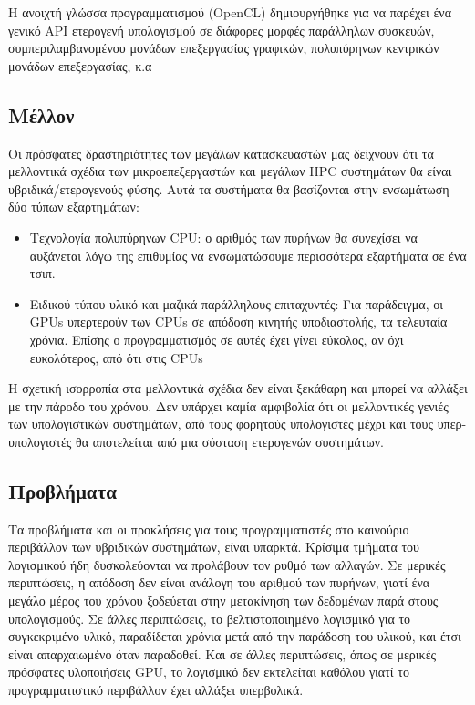 Η ανοιχτή γλώσσα προγραμματισμού (OpenCL) δημιουργήθηκε για να παρέχει ένα γενικό API ετερογενή υπολογισμού σε διάφορες μορφές παράλληλων συσκευών, συμπεριλαμβανομένου μονάδων επεξεργασίας γραφικών, πολυπύρηνων κεντρικών μονάδων επεξεργασίας, κ.α
\subsection{Μέλλον}
Οι πρόσφατες δραστηριότητες των μεγάλων κατασκευαστών μας δείχνουν ότι τα μελλοντικά σχέδια των μικροεπεξεργαστών και μεγάλων HPC συστημάτων θα είναι υβριδικά/ετερογενούς φύσης. Αυτά τα συστήματα θα βασίζονται στην ενσωμάτωση δύο τύπων εξαρτημάτων:
\begin{itemize}
\item Τεχνολογία πολυπύρηνων CPU: ο αριθμός των πυρήνων θα συνεχίσει να αυξάνεται λόγω της επιθυμίας να ενσωματώσουμε περισσότερα εξαρτήματα σε ένα τσιπ.
\item Ειδικού τύπου υλικό και μαζικά παράλληλους επιταχυντές: Για παράδειγμα, οι GPUs υπερτερούν των CPUs σε απόδοση κινητής υποδιαστολής, τα τελευταία χρόνια. Επίσης ο προγραμματισμός σε αυτές έχει γίνει εύκολος, αν όχι ευκολότερος, από ότι στις CPUs
\end{itemize}
Η σχετική ισορροπία στα μελλοντικά σχέδια δεν είναι ξεκάθαρη και μπορεί να αλλάξει με την πάροδο του χρόνου. Δεν υπάρχει καμία αμφιβολία ότι οι μελλοντικές γενιές των υπολογιστικών συστημάτων, από τους φορητούς υπολογιστές μέχρι και τους υπερ-υπολογιστές θα αποτελείται από μια σύσταση ετερογενών συστημάτων. 
\subsection{Προβλήματα}
Τα προβλήματα και οι προκλήσεις για τους προγραμματιστές στο καινούριο περιβάλλον των υβριδικών συστημάτων, είναι υπαρκτά. Κρίσιμα τμήματα του λογισμικού ήδη δυσκολεύονται να προλάβουν τον ρυθμό των αλλαγών. Σε μερικές περιπτώσεις, η απόδοση δεν είναι ανάλογη του αριθμού των πυρήνων, γιατί ένα μεγάλο μέρος του χρόνου ξοδεύεται στην μετακίνηση των δεδομένων παρά στους υπολογισμούς. Σε άλλες περιπτώσεις, το βελτιστοποιημένο λογισμικό για το συγκεκριμένο υλικό, παραδίδεται χρόνια μετά από την παράδοση του υλικού, και έτσι είναι απαρχαιωμένο όταν παραδοθεί. Και σε άλλες περιπτώσεις, όπως σε μερικές πρόσφατες υλοποιήσεις GPU, το λογισμικό δεν εκτελείται καθόλου γιατί το προγραμματιστικό περιβάλλον έχει αλλάξει υπερβολικά.




